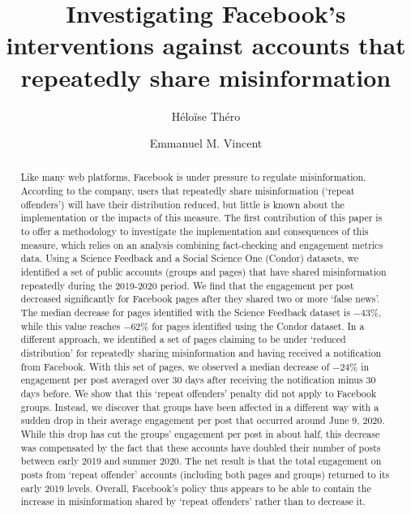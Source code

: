 \documentclass[review]{elsarticle}
\begin{document}
\begin{frontmatter}

\title{Investigating Facebook's interventions against accounts that repeatedly share misinformation}

\author[mymainaddress]{Héloïse Théro}

\author[mymainaddress]{Emmanuel M. Vincent}

\address[mymainaddress]{médialab - Sciences Po, Paris, France}

\begin{abstract}

Like many web platforms, Facebook is under pressure to regulate misinformation.
According to the company, users that repeatedly share misinformation (`repeat offenders') will have their distribution reduced, but little is known about the implementation or the impacts of this measure.
The first contribution of this paper is to offer a methodology to investigate the implementation and consequences of this measure, which relies on an analysis combining fact-checking and engagement metrics data. 
Using a Science Feedback and a Social Science One (Condor) datasets, we identified a set of public accounts (groups and pages) that have shared misinformation repeatedly during the 2019-2020 period. 
We find that the engagement per post decreased significantly for Facebook pages after they shared two or more `false news'. 
The median decrease for pages identified with the Science Feedback dataset is $-43\%$, while this value reaches $-62\%$ for pages identified using the Condor dataset.
In a different approach, we identified a set of pages claiming to be under `reduced distribution' for repeatedly sharing misinformation and having received a notification from Facebook. 
With this set of pages, we observed a median decrease of $-24\%$ in engagement per post averaged over 30 days after receiving the notification minus 30 days before.
We show that this `repeat offenders' penalty did not apply to Facebook groups. 
Instead, we discover that groups have been affected in a different way with a sudden drop in their average engagement per post that occurred around June 9, 2020. 
While this drop has cut the groups' engagement per post in about half, this decrease was compensated by the fact that these accounts have doubled their number of posts between early 2019 and summer 2020. 
The net result is that the total engagement on posts from `repeat offender' accounts (including both pages and groups) returned to its early 2019 levels. 
Overall, Facebook’s policy thus appears to be able to contain the increase in misinformation shared by `repeat offenders' rather than to decrease it.



\end{abstract}
\end{frontmatter}
\end{document}
